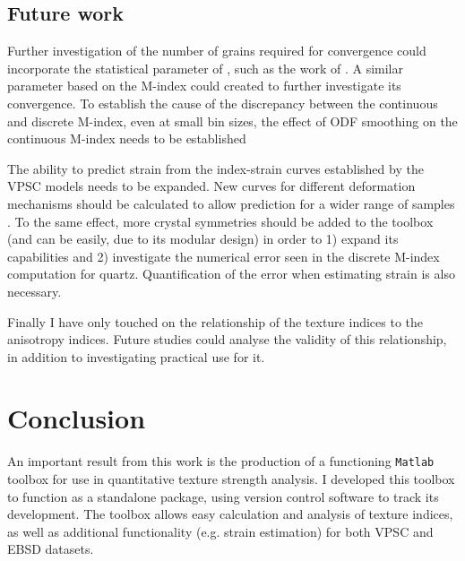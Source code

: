 \documentclass[a4paper,12pt,twoside]{report}
\numberwithin{equation}{chapter}
\begin{document}
\section{Future work}

Further investigation of the number of grains required for convergence could incorporate the statistical parameter of \cite{Pospiech1994}, such as the work of \cite{Bozzolo2007}. A similar parameter based on the M-index could created to further investigate its convergence. To establish the cause of the discrepancy between the continuous and discrete M-index, even at small bin sizes, the effect of ODF smoothing on the continuous M-index needs to be established \citep[possibly by analysing the kernel method of][]{Hielscher2008} 

The ability to predict strain from the index-strain curves established by the VPSC models needs to be expanded. New curves for different deformation mechanisms should be calculated to allow prediction for a wider range of samples \citep[possibly using more advanced modelling e.g.][]{PonteCastañeda2002}. To the same effect, more crystal symmetries should be added to the toolbox (and can be easily, due to its modular design) in order to 1) expand its capabilities and 2) investigate the numerical error seen in the discrete M-index computation for quartz. Quantification of the error when estimating strain is also necessary.

Finally I have only touched on the relationship of the texture indices to the anisotropy indices. Future studies could analyse the validity of this relationship, in addition to investigating practical use for it.  



\chapter{Conclusion} \label{chap:conclusion}
\vspace{-1cm}
An important result from this work is the production of a functioning \texttt{Matlab} toolbox for use in quantitative texture strength analysis. I developed this toolbox to function as a standalone package, using version control software to track its development. The toolbox allows easy calculation and analysis of texture indices, as well as additional functionality (e.g. strain estimation) for both VPSC and EBSD datasets. 
\end{document}
